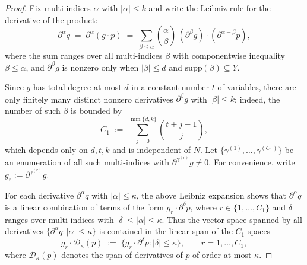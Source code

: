 \documentclass[12pt]{article}
\theoremstyle{definition}
\theoremstyle{definition}
\theoremstyle{remark}
\theoremstyle{remark}
\begin{document}
\begin{proof}
Fix multi-indices $\alpha$ with $|\alpha|\le k$ and write the Leibniz rule
for the derivative of the product:
\[
   \partial^\alpha q
   \;=\; \partial^\alpha (g\cdot p)
   \;=\; \sum_{\beta\le \alpha}
          {\alpha \choose \beta}\,
          (\partial^\beta g)\cdot (\partial^{\alpha-\beta}p),
\]
where the sum ranges over all multi-indices $\beta$ with componentwise
inequality $\beta\le \alpha$, and $\partial^\beta g$ is nonzero only when
$|\beta| \le d$ and $\mathrm{supp}(\beta)\subseteq Y$.

Since $g$ has total degree at most $d$ in a constant number $t$ of
variables, there are only finitely many distinct nonzero derivatives
$\partial^\beta g$ with $|\beta|\le k$; indeed, the number of such
$\beta$ is bounded by
\[
   C_1 \;:=\; \sum_{j=0}^{\min\{d,k\}} \binom{t+j-1}{j},
\]
which depends only on $d,t,k$ and is independent of $N$. Let
$\{\gamma^{(1)},\dots,\gamma^{(C_1)}\}$ be an enumeration of all such
multi-indices with $\partial^{\gamma^{(r)}} g \neq 0$. For convenience,
write $g_r := \partial^{\gamma^{(r)}} g$.

For each derivative $\partial^\alpha q$ with $|\alpha|\le \kappa$, the above
Leibniz expansion shows that $\partial^\alpha q$ is a linear combination
of terms of the form $g_r\cdot \partial^\delta p$, where
$r\in\{1,\dots,C_1\}$ and $\delta$ ranges over multi-indices with
$|\delta|\le |\alpha|\le \kappa$. Thus the vector space spanned by all
derivatives $\{\partial^\alpha q : |\alpha|\le \kappa\}$ is contained in the
linear span of the $C_1$ spaces
\[
   g_r \cdot \mathcal{D}_\kappa(p)
   \;:=\; \{g_r\cdot \partial^\delta p : |\delta|\le \kappa\},
   \qquad r=1,\dots,C_1,
\]
where $\mathcal{D}_\kappa(p)$ denotes the span of derivatives of $p$ of order
at most $\kappa$.


\end{proof}
\end{document}
